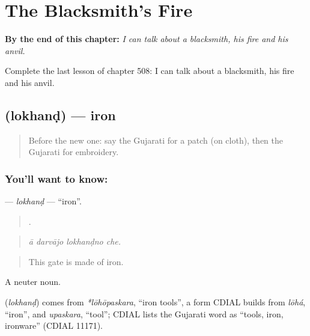 
\chapter{The Blacksmith's Fire}
\label{ch:gu-the-blacksmith-s-fire}

\begin{chapteropening}
\textbf{By the end of this chapter:} \emph{I can talk about a blacksmith, his fire and his anvil.}

Complete the last lesson of chapter 508: I can talk about a blacksmith, his fire and his anvil.
\end{chapteropening}

\section[\texorpdfstring{\gu{લોખંડ} (lokhanḍ)}{લોખંડ (lokhanḍ)}]{ (lokhanḍ) — iron}

\label{lesson:GU-C508-lokhand}



\begin{quote}
Before the new one: say the Gujarati for a patch (on cloth), then the Gujarati for embroidery.
\end{quote}

\subsection*{You'll want to know: }
\textbf{} — \emph{lokhanḍ} — \textquotedblleft{}iron\textquotedblright{}.

\begin{quote}
   .
\end{quote}

\begin{quote}
\emph{ā darvājo lokhanḍno che.}
\end{quote}

\begin{quote}
This gate is made of iron.
\end{quote}

A neuter noun.

\begin{cousinweb}
\textbf{} (\emph{lokhanḍ}) comes from \emph{*lōhōpaskara}, \textquotedblleft{}iron tools\textquotedblright{}, a form CDIAL builds from \emph{lōhá}, \textquotedblleft{}iron\textquotedblright{}, and \emph{upaskara}, \textquotedblleft{}tool\textquotedblright{}; CDIAL lists the Gujarati word as \textquotedblleft{}tools, iron, ironware\textquotedblright{} (CDIAL 11171).
\end{cousinweb}

